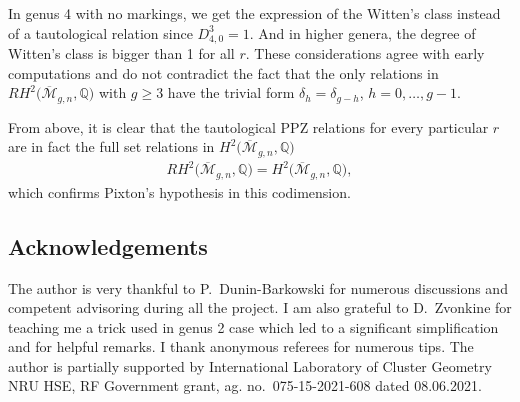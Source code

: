\documentclass[pdftex]{sigma}
\def\oM{\overline{\mathcal{M}}}
\numberwithin{equation}{section}
\begin{document}
In genus 4 with no markings, we get the expression of the Witten's class instead of a tautological relation since
$D^3_{4,0} = 1$.
And in higher genera, the degree of Witten's class is bigger than 1 for all $r$. These considerations agree with early computations and do not contradict the fact that the only relations in $RH^2\big(\oM_{g,n},\mathbb{Q}\big)$ with $g\geq 3$ have the trivial form $\delta_h=\delta_{g-h}$, $h=0,\dots, g-1$.

From above, it is clear that the tautological PPZ relations for every particular $r$ are in fact the full set relations in $H^2\big(\oM_{g,n},\mathbb{Q}\big)$
 \begin{align*}
RH^2\big(\oM_{g,n},\mathbb{Q}\big) = H^2\big(\oM_{g,n},\mathbb{Q}\big),
\end{align*}
which confirms Pixton's hypothesis in this codimension.

\subsection*{Acknowledgements}
The author is very thankful to P.~Dunin-Barkowski for numerous discussions and competent advisoring during all the project. I am also grateful to D.~Zvonkine for teaching me a trick used in genus 2 case which led to a significant simplification and for helpful remarks. I thank anonymous referees for numerous tips. The author is partially supported by International Laboratory of Cluster Geometry NRU HSE, RF Government grant, ag. no.~075-15-2021-608 dated 08.06.2021.
\end{document}
